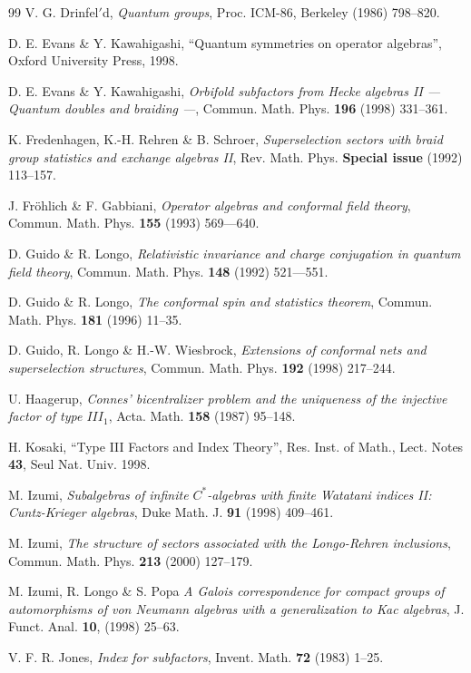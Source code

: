 \documentclass[12pt]{article}
\begin{document}
{\begin{thebibliography}{99}
V. G. Drinfel$'$d,  {\it Quantum groups},
Proc. ICM-86, Berkeley (1986) 798--820.

 D. E. Evans \& Y. Kawahigashi,
``Quantum symmetries on operator algebras'',
Oxford University Press, 1998.

 D. E. Evans \& Y. Kawahigashi,
{\it Orbifold subfactors from Hecke algebras II --- Quantum
doubles and braiding ---},
Commun. Math. Phys. {\bf 196} (1998) 331--361.

K. Fredenhagen, K.-H. Rehren \& B. Schroer,
{\it Superselection sectors with braid group statistics
and exchange algebras II},  Rev. Math. Phys.
{\bf Special issue} (1992) 113--157.

 J. Fr\"ohlich \& F. Gabbiani, {\it Operator algebras and 
conformal field theory}, Commun.  Math.  Phys.  {\bf 155} (1993) 
569---640.

 D. Guido \& R. Longo, {\it Relativistic invariance and 
charge conjugation in quantum field theory}, Commun.  Math.  Phys.  
{\bf 148} (1992) 521---551.

D. Guido \& R. Longo, {\it The conformal spin and statistics theorem}, 
Commun.  Math.  Phys.  {\bf 181} (1996) 11--35.

D. Guido, R. Longo \& H.-W. Wiesbrock, {\it Extensions of conformal 
nets and superselection structures}, Commun.  Math.  Phys.  {\bf 192} 
(1998) 217--244.

U. Haagerup, {\it Connes' bicentralizer problem and the uniqueness of 
the injective factor of type $III_1$}, Acta.  Math.  {\bf 158} (1987) 
95--148.

H. Kosaki, ``Type III Factors and Index Theory'', Res. Inst. of
Math., Lect. Notes {\bf 43}, Seul Nat. Univ. 1998.

 M. Izumi,
{\it Subalgebras of infinite $C^*$-algebras with
finite Watatani indices II: Cuntz-Krieger algebras},
Duke Math. J. {\bf 91} (1998) 409--461.

 M. Izumi,
{\it The structure of sectors associated with the Longo-Rehren
inclusions}, Commun. Math. Phys. {\bf 213} (2000) 127--179.

 M. Izumi, R. Longo \& S. Popa
{\it  A Galois correspondence for compact groups of automorphisms
of von Neumann algebras with a generalization to Kac algebras},
J. Funct. Anal. {\bf 10}, (1998) 25--63.

V. F. R. Jones, {\it Index for subfactors}, Invent.  Math.  {\bf 72} 
(1983) 1--25.


\end{thebibliography}}
\end{document}
